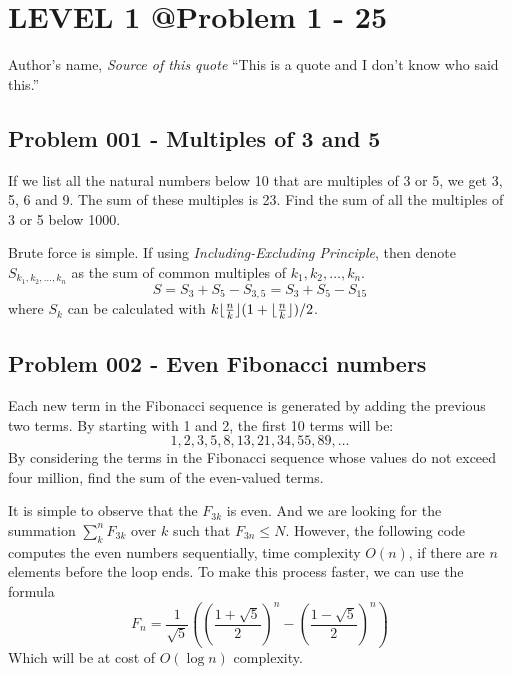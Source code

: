 \chapter{LEVEL 1 @Problem 1 - 25}

\begin{chapquote}{Author's name, \textit{Source of this quote}}
	``This is a quote and I don't know who said this.''
\end{chapquote}

\section{Problem 001 - Multiples of 3 and 5}
\begin{prob}
If we list all the natural numbers below 10 that are multiples of 3 or 5, we get 3, 5, 6 and 9. The sum of these multiples is 23. Find the sum of all the multiples of 3 or 5 below 1000.
\end{prob}

\begin{sol}
Brute force is simple.
If using \emph{Including-Excluding Principle}, then denote $S_{k_1, k_2, \dots, k_n}$ as the sum of common multiples of $k_1, k_2,\dots,k_n$.
\begin{equation}
S = S_3 + S_5 - S_{3, 5} = S_3 + S_5 - S_{15}
\end{equation}
where $S_k$ can be calculated with $k\lfloor\frac{n}{k}\rfloor( 1 + \lfloor\frac{n}{k}\rfloor)/2$.
\end{sol}

\section{Problem 002 - Even Fibonacci numbers}
\begin{prob}
Each new term in the Fibonacci sequence is generated by adding the previous two terms. By starting with 1 and 2, the first 10 terms will be:	
	$$1, 2, 3, 5, 8, 13, 21, 34, 55, 89, \dots$$
By considering the terms in the Fibonacci sequence whose values do not exceed four million, find the sum of the even-valued terms.
\end{prob}

\begin{sol}
It is simple to observe that the $F_{3k}$ is even. And we are looking for the summation $\sum_{k}^n F_{3k}$  over $k$ such that $F_{3n} \le N$. However, the following code computes the even numbers sequentially, time complexity $O(n)$, if there are $n$ elements before the loop ends.
To make this process faster, we can use the formula
\begin{equation}
F_n = \frac{1}{\sqrt{5}}\left(\left(\frac{1 + \sqrt{5}}{2}\right)^n - \left(\frac{1 - \sqrt{5}}{2}\right)^n\right)
\end{equation}
Which will be at cost of $O(\log n)$ complexity.
\end{sol}

